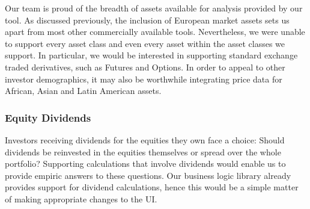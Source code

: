 \documentclass[main.tex]{subfiles}
\begin{document}
Our team is proud of the breadth of assets available for analysis provided by our tool. As discussed previously, the inclusion of European market assets sets us apart from most other commercially available tools. Nevertheless, we were unable to support every asset class and even every asset within the asset classes we support. In particular, we would be interested in supporting standard exchange traded derivatives, such as Futures and Options. In order to appeal to other investor demographics, it may also be worthwhile integrating price data for African, Asian and Latin American assets.

\subsubsection{Equity Dividends}

Investors receiving dividends for the equities they own face a choice: Should dividends be reinvested in the equities themselves or spread over the whole portfolio? Supporting calculations that involve dividends would enable us to provide empiric answers to these questions. Our business logic library already provides support for dividend calculations, hence this would be a simple matter of making appropriate changes to the UI.
\end{document}
